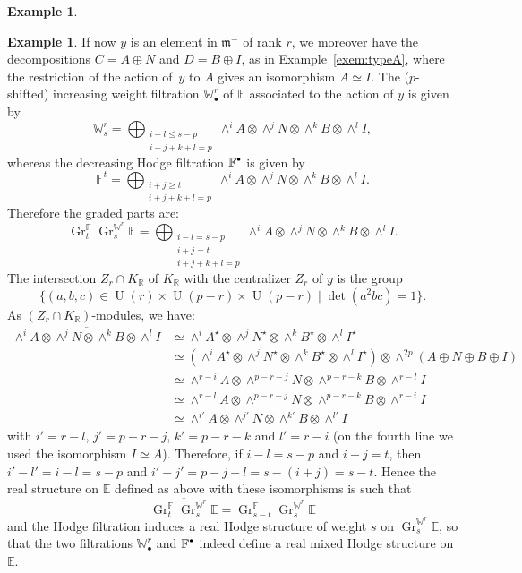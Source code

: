 \documentclass[JEP,XML,SOM,Unicode,NoFloatCountersInSection]{cedram}
\newcommand{\sbullet}{{\scriptscriptstyle\bullet}}
\newcommand{\scbullet}{{\raisebox{1pt}{$\sbullet$}}}
\theoremstyle{plain}
\theoremstyle{definition}
\newtheorem{exem}[theo]{Example}
\let\ov\overline
\let\rgy r
\DeclareMathOperator{\Gr}{Gr}
\DeclareMathOperator{\rU}{U}
\newcommand{\bE}{\mathbb{E}}
\newcommand{\bF}{\mathbb{F}}
\newcommand{\bR}{\mathbb{R}}
\newcommand{\Wr}{\mathbb{W}^\rgy}
\newcommand{\fm}{\mathfrak{m}}
\begin{document}
\begin{exem}
\begin{exem}
If now $y$ is an element in $\fm^-$ of rank $\rgy$, we moreover have the decompositions $C=A\oplus N$
and $D=B\oplus I$, as in Example~\ref{exem:typeA}, where the restriction of the action of~$y$ to $A$ gives an isomorphism
$A\simeq I$. The ($p$-shifted) increasing weight filtration $\Wr_\sbullet$ of $\bE$ associated
to the action of $y$ is given by
$$
\Wr_s=\bigoplus_{\substack{i-l\leq s-p\\ i+j+k+l=p}}\wedge^iA\otimes\wedge^jN\otimes\wedge^kB\otimes\wedge^lI,
$$
whereas the decreasing Hodge filtration $\bF^\scbullet$ is given by
$$
\bF^t=\bigoplus_{\substack{i+j\geq t\\ i+j+k+l=p}}\wedge^iA\otimes\wedge^jN\otimes\wedge^kB\otimes\wedge^lI.
$$
Therefore the graded parts are:
$$
\Gr^\bF_t\Gr^{\Wr}_s\bE=
\bigoplus_{\substack{i-l=s-p\\ i+j=t\\ i+j+k+l=p}}\wedge^iA\otimes\wedge^jN\otimes\wedge^kB\otimes\wedge^lI.
$$
The intersection $Z_r \cap K_\bR$ of $K_\bR$ with the centralizer $Z_r$ of $y$ is the group
$$\{(a,b,c)\in\rU(r)\times\rU(p-r)\times\rU(p-r)\mid \det(a^2bc)=1\}.$$
As $(Z_r \cap K_\bR)$-modules, we have:
\begin{align*}
\ov{\wedge^iA\otimes\wedge^jN\otimes\wedge^kB\otimes\wedge^lI}
& \simeq \wedge^iA^\star\otimes\wedge^jN^\star\otimes\wedge^kB^\star\otimes\wedge^lI^\star \\
& \simeq (\wedge^iA^\star\otimes\wedge^jN^\star\otimes\wedge^kB^\star\otimes\wedge^lI^\star)
\otimes\wedge^{2p}(A\oplus N\oplus B\oplus I) \\
& \simeq \wedge^{r-i}A\otimes\wedge^{p-r-j}N\otimes\wedge^{p-r-k}B\otimes\wedge^{r-l}I \\
& \simeq \wedge^{r-l}A\otimes\wedge^{p-r-j}N\otimes\wedge^{p-r-k}B\otimes\wedge^{r-i}I
\\
& \simeq \wedge^{i'}A\otimes\wedge^{j'}N\otimes\wedge^{k'}B\otimes\wedge^{l'}I
\end{align*}
with $i'=r-l$, $j'=p-r-j$, $k'=p-r-k$ and $l'=r-i$
(on the fourth line we used the isomorphism $I \simeq A$).
Therefore, if $i-l=s-p$ and $i+j=t$, then $i'-l'=i-l=s-p$ and $i'+j'=p-j-l=s-(i+j)=s-t$. Hence the real
structure on $\bE$ defined as above with these isomorphisms is such that
$$
\ov{\Gr^\bF_t\Gr^{\Wr}_s\bE}=\Gr^\bF_{s-t}\Gr^{\Wr}_s\bE
$$
and the Hodge filtration induces a real Hodge structure of weight $s$ on $\Gr^{\Wr}_s\bE$, so
that the two filtrations $\Wr_\sbullet$ and $\bF^\scbullet$ indeed define a real mixed Hodge
structure on $\bE$.
\end{exem}


\end{exem}
\end{document}
